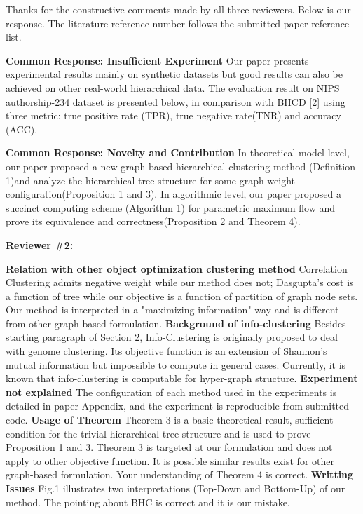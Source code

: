 \documentclass{article}
\begin{document}
Thanks for the constructive comments made by all three reviewers.
Below is our response. The literature reference number follows the submitted paper reference list. 

\textbf{Common Response: Insufficient Experiment}
Our paper presents experimental results mainly on synthetic datasets but good results can also be achieved on other real-world hierarchical data. The evaluation result on NIPS authorship-234 dataset is presented below, in comparison with BHCD [2] using three metric: true positive rate (TPR), true negative rate(TNR) and accuracy (ACC). 

\textbf{Common Response: Novelty and Contribution}
In theoretical model level, our paper proposed a new graph-based hierarchical clustering method (Definition 1)and analyze the hierarchical tree structure for some graph weight configuration(Proposition 1 and 3). In algorithmic level, our paper proposed a  succinct computing scheme (Algorithm 1) for parametric maximum flow and prove its equivalence and correctness(Proposition 2 and Theorem 4).

\textbf{Reviewer \#2:}

\textbf{Relation with other object optimization clustering method}
Correlation Clustering admits negative weight while our method does not; Dasgupta's cost is a function of tree while our objective is a function of partition of graph node sets. Our method is interpreted in a "maximizing information" way and is different from other graph-based formulation.
\textbf{Background of info-clustering} Besides starting paragraph of Section 2, Info-Clustering is originally proposed to deal with genome clustering. Its objective function is an extension of Shannon's mutual information but impossible to compute in general cases. Currently, it is known that info-clustering is computable for hyper-graph structure.
\textbf{Experiment not explained} The configuration of each method used in the experiments is detailed in paper Appendix, and the experiment is reproducible from submitted code.
\textbf{Usage of Theorem} Theorem 3 is a basic theoretical result, sufficient condition for the trivial hierarchical tree structure and is used to prove Proposition 1 and 3. Theorem 3 is targeted at our formulation and does not apply to other objective function. It is possible similar results exist for other graph-based formulation. Your understanding of Theorem 4 is correct.
\textbf{Writting Issues} Fig.1 illustrates two interpretations (Top-Down and Bottom-Up) of our method. The pointing about BHC is correct and it is our mistake.
\end{document}

